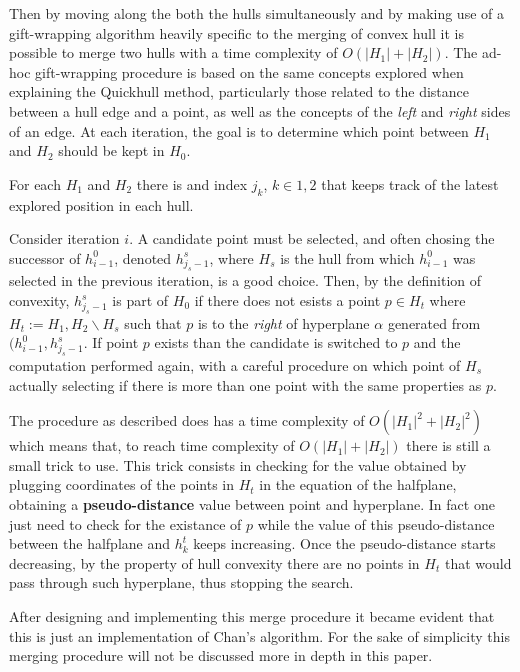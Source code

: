 \documentclass[a4paper]{article}
\begin{document}
Then by moving along the both the hulls simultaneously and by making use of a gift-wrapping algorithm heavily specific to the merging of convex hull it is possible to merge two hulls with a time complexity of $O(|H_1|+|H_2|)$.
The ad-hoc gift-wrapping procedure is based on the same concepts explored when explaining the Quickhull method, particularly those related to the distance between a hull edge and a point, as well as the concepts of the \textit{left} and \textit{right} sides of an edge.
At each iteration, the goal is to determine which point between $H_1$ and $H_2$ should be kept in $H_0$.

For each $H_1$ and $H_2$ there is and index $j_k$, $k \in {1,2}$ that keeps track of the latest explored position in each hull.

Consider iteration $i$.
A candidate point must be selected, and often chosing the successor of $h^0_{i-1}$, denoted $h^s_{j_s-1}$, where $H_s$ is the hull from which $h^0_{i-1}$  was selected in the previous iteration, is a good choice.
Then, by the definition of convexity, $h^s_{j_s-1}$ is part of $H_0$ if there does not esists a point $p \in H_t$ where $H_t := {H_1, H_2} \backslash H_s$ such that $p$ is to the \textit{right} of hyperplane $\alpha$ generated from $(h^0_{i-1}, h^s_{j_s-1}$.
If point $p$ exists than the candidate is switched to $p$ and the computation performed again, with a careful procedure on which point of $H_s$ actually selecting if there is more than one point with the same properties as $p$.

The procedure as described does has a time complexity of $O(|H_1|^2+|H_2|^2)$ which means that, to reach time complexity of $O(|H_1|+|H_2|)$ there is still a small trick to use.
This trick consists in checking for the value obtained by plugging coordinates of the points in $H_t$ in the equation of the halfplane, obtaining a \textbf{pseudo-distance} value between point and hyperplane.
In fact one just need to check for the existance of $p$ while the value of this pseudo-distance between the halfplane and $h^t_k$ keeps increasing.
Once the pseudo-distance starts decreasing, by the property of hull convexity there are no points in $H_t$ that would pass through such hyperplane, thus stopping the search.

After designing and implementing this merge procedure it became evident that this is just an implementation of Chan's algorithm.
For the sake of simplicity this merging procedure will not be discussed more in depth in this paper.
\end{document}
